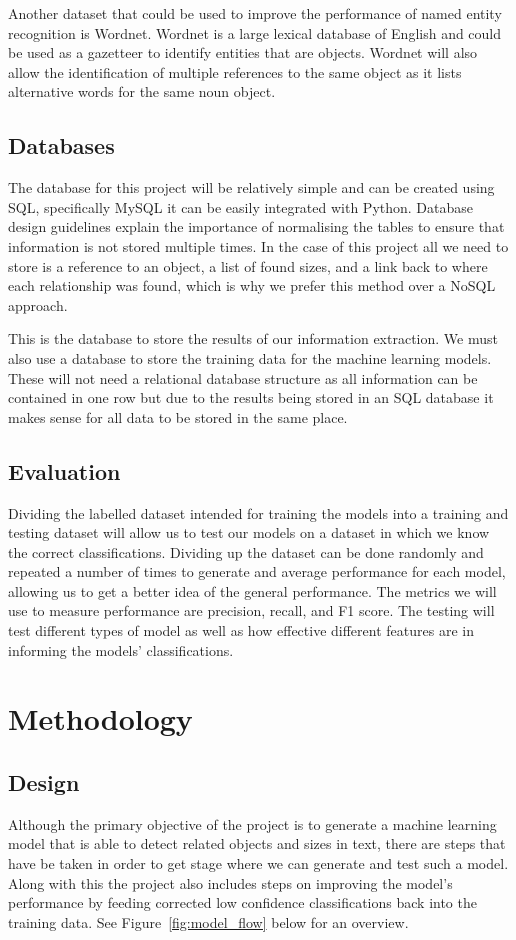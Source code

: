 \documentclass[11pt,oneside]{book}
\begin{document}
Another dataset that could be used to improve the performance of named entity recognition is Wordnet. Wordnet is a large lexical database of English and could be used as a gazetteer to identify entities that are objects. Wordnet will also allow the identification of multiple references to the same object as it lists alternative words for the same noun object.

\section{Databases}
The database for this project will be relatively simple and can be created using SQL, specifically MySQL it can be easily integrated with Python. Database design guidelines explain the importance of normalising the tables to ensure that information is not stored multiple times. In the case of this project all we need to store is a reference to an object, a list of found sizes, and a link back to where each relationship was found, which is why we prefer this method over a NoSQL approach.

This is the database to store the results of our information extraction. We must also use a database to store the training data for the machine learning models. These will not need a relational database structure as all information can be contained in one row but due to the results being stored in an SQL database it makes sense for all data to be stored in the same place.

\section{Evaluation}
Dividing the labelled dataset intended for training the models into a training and testing dataset will allow us to test our models on a dataset in which we know the correct classifications. Dividing up the dataset can be done randomly and repeated a number of times to generate and average performance for each model, allowing us to get a better idea of the general performance. The metrics we will use to measure performance are precision, recall, and F1 score. The testing will test different types of model as well as how effective different features are in informing the models' classifications.

\chapter{Methodology}
\section{Design}
Although the primary objective of the project is to generate a machine learning model that is able to detect related objects and sizes in text, there are steps that have be taken in order to get stage where we can generate and test such a model. Along with this the project also includes steps on improving the model's performance by feeding corrected low confidence classifications back into the training data. See Figure~\ref{fig:model_flow} below for an overview. \newpage
\end{document}
